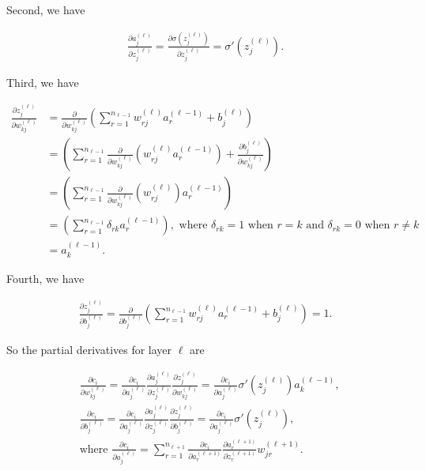 \documentclass{article}
\begin{document}
	Second, we have
	
	\begin{align*}
		\frac{\partial a^{(\ell)}_j}{\partial z^{(\ell)}_j} = \frac{\partial \sigma(z^{(\ell)}_j)}{\partial z^{(\ell)}_j} = \sigma'(z^{(\ell)}_j).
	\end{align*}
	
	Third, we have
	
	\begin{align*}
		\frac{\partial z^{(\ell)}_j}{\partial w^{(\ell)}_{kj}} &=  \frac{\partial}{\partial w^{(\ell)}_{kj}}\left(\sum_{r = 1}^{n_{\ell-1}} w^{(\ell)}_{rj} a^{(\ell-1)}_r + b^{(\ell)}_j\right) \\
		&= \left(\sum_{r = 1}^{n_{\ell-1}} \frac{\partial}{\partial w^{(\ell)}_{kj}}\left(w^{(\ell)}_{rj} a^{(\ell-1)}_r\right) + \frac{\partial b^{(\ell)}_j}{\partial w^{(\ell)}_{kj}}\right) \\
		&= \left(\sum_{r = 1}^{n_{\ell-1}} \frac{\partial}{\partial w^{(\ell)}_{kj}}\left(w^{(\ell)}_{rj}\right) a^{(\ell-1)}_r \right) \\
		&= \left(\sum_{r = 1}^{n_{\ell-1}} \delta_{rk} a^{(\ell-1)}_r \right), \text{ where $\delta_{rk} = 1$ when $r = k$ and $\delta_{rk} = 0$ when $r \neq k$} \\
		&= a^{(\ell-1)}_k.
	\end{align*}
	
	Fourth, we have
	
	\begin{align*}
		\frac{\partial z^{(\ell)}_j}{\partial b^{(\ell)}_j} = \frac{\partial}{\partial b^{(\ell)}_j}\left(\sum_{r = 1}^{n_{\ell-1}} w^{(\ell)}_{rj} a^{(\ell-1)}_r + b^{(\ell)}_j\right) = 1.
	\end{align*}
	
	So the partial derivatives for layer $\ell$ are
	
	\begin{align*}
		&\frac{\partial c_i}{\partial w^{(\ell)}_{kj}} = \frac{\partial c_i}{\partial a^{(\ell)}_j} \frac{\partial a^{(\ell)}_j}{\partial z^{(\ell)}_j} \frac{\partial z^{(\ell)}_j}{\partial w^{(\ell)}_{kj}} = \frac{\partial c_i}{\partial a^{(\ell)}_j} \sigma'(z^{(\ell)}_j) a^{(\ell - 1)}_k, \\
		&\frac{\partial c_i}{\partial b^{(\ell)}_j} = \frac{\partial c_i}{\partial a^{(\ell)}_j} \frac{\partial a^{(\ell)}_j}{\partial z^{(\ell)}_j} \frac{\partial z^{(\ell)}_j}{\partial b^{(\ell)}_j} = \frac{\partial c_i}{\partial a^{(\ell)}_j} \sigma'(z^{(\ell)}_j), \\
		&\text{where } \frac{\partial c_i}{\partial a^{(\ell)}_j} = \sum_{r = 1}^{n_{\ell+1}} \frac{\partial c_i}{\partial a^{(\ell + 1)}_r} \frac{\partial a^{(\ell + 1)}_r}{\partial z^{(\ell + 1)}_r} w^{(\ell + 1)}_{jr}.
	\end{align*}
	
\end{document}
